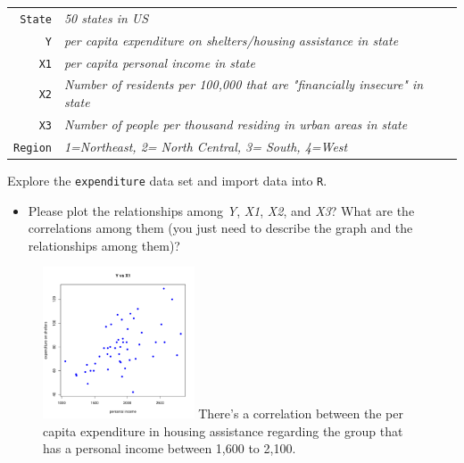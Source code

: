 \documentclass[12pt,letterpaper]{article}
\begin{document}
\begin{tabular}{r|l}
	\texttt{State} &\emph{50 states in US} \\
	\texttt{Y} & \emph{per capita expenditure on shelters/housing assistance in state}\\
	\texttt{X1} &\emph{per capita personal income in state} \\
	\texttt{X2} &  \emph{Number of residents per 100,000 that are "financially insecure" in state}\\
	\texttt{X3} &  \emph{Number of people per thousand residing in urban areas in state} \\
	\texttt{Region} &  \emph{1=Northeast, 2= North Central, 3= South, 4=West} \\
\end{tabular}

\clearpage

\vspace{.7cm}
\noindent Explore the \texttt{expenditure} data set and import data into \texttt{R}.
\vspace{.7cm}

  
\vspace{.7cm}



\clearpage

\begin{itemize}
\item
Please plot the relationships among \emph{Y}, \emph{X1}, \emph{X2}, and \emph{X3}? What are the correlations among them (you just need to describe the graph and the relationships among them)?
\end{itemize}



	
	\begin{figure}[ht]
		\centering
		\includegraphics[width=0.40\textwidth]{plot_example1.pdf}
		\center
		There's a correlation between the per capita expenditure in housing assistance regarding the group that has a personal income between 1,600 to 2,100.
	\end{figure}
	
\end{document}
